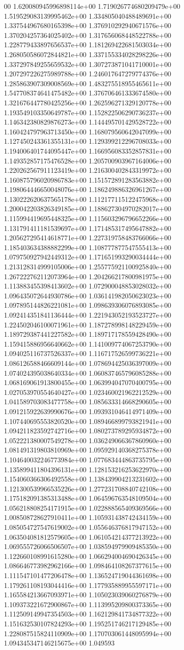00	1.620080945996898114e+00	1.719026774680209479e+00	1.519529083139995462e+00	1.334805040488489691e+00	1.337544967680165398e+00	1.376910292940671576e+00	1.370204257364025402e+00	1.317656068448522788e+00	1.228779433897656537e+00	1.181269422681503034e+00	1.268050586072844821e+00	1.337155334028298226e+00	1.337297849255659532e+00	1.307273871041710001e+00	1.207297226275989788e+00	1.246017647279774376e+00	1.285863907309008569e+00	1.483275518955465611e+00	1.547708374641475482e+00	1.376706461333674580e+00	1.321676447780425256e+00	1.262596271329120778e+00	1.193549103350649787e+00	1.152822506290736237e+00	1.146342380829876273e+00	1.144495701429528722e+00	1.160424797963713450e+00	1.168079560642047099e+00	1.127450243361355131e+00	1.129399212296708033e+00	1.194006401744095447e+00	1.166956083352857831e+00	1.149352857175476528e+00	1.205700903967164006e+00	1.220262567911123419e+00	1.216300402843319972e+00	1.160875796020986783e+00	1.151572891283563882e+00	1.198064446650048076e+00	1.186249886326961267e+00	1.130222620637565178e+00	1.112177115122475968e+00	1.200042203826349185e+00	1.188627304970282017e+00	1.115994419695448325e+00	1.115603296796652266e+00	1.131791411181539697e+00	1.171485317495647882e+00	1.205627295414618771e+00	1.227319758483766066e+00	1.185403634388882299e+00	1.108777877547555413e+00	1.079750927942449312e+00	1.171651993290034444e+00	1.213128314999105006e+00	1.255775921100925840e+00	1.267222762112073964e+00	1.204266217800981975e+00	1.113883455398413602e+00	1.072900048853028032e+00	1.096435072644930786e+00	1.036141982050623023e+00	1.097895144826221081e+00	1.098639306076893085e+00	1.092414351841136444e+00	1.221943052193523727e+00	1.224502046100071961e+00	1.187278998148229459e+00	1.189729387441227582e+00	1.189717178559428490e+00	1.159415886956640662e+00	1.141009774067253790e+00	1.094025116737526337e+00	1.116717526599736221e+00	1.086126588466609144e+00	1.078694425036397009e+00	1.074024395038640334e+00	1.060837465796085288e+00	1.068169061913800455e+00	1.063994047070400795e+00	1.027053970554640427e+00	1.023460021962212529e+00	1.041589703083477758e+00	1.085633314668290605e+00	1.091215922639990676e+00	1.093931046414971409e+00	1.107440695553820520e+00	1.089466899793821941e+00	1.094211823592742716e+00	1.080273789295934872e+00	1.052221380007549278e+00	1.036249066367860960e+00	1.081491319803810969e+00	1.095929140368275378e+00	1.104640032246773984e+00	1.077683444863735795e+00	1.135899411804396131e+00	1.128153216253622970e+00	1.154060366306492558e+00	1.138439904213231602e+00	1.121300539966535226e+00	1.277231708840742108e+00	1.175182091385313488e+00	1.064596763548109504e+00	1.056218808254171915e+00	1.022888565409369566e+00	1.008508728627910411e+00	1.105931438742434159e+00	1.085054727547619002e+00	1.055646376817947152e+00	1.063504081812579605e+00	1.061054214377213922e+00	1.069555726066506507e+00	1.038594979909485350e+00	1.122660108991615280e+00	1.066294004690426345e+00	1.086646773982962166e+00	1.098464108267377615e+00	1.111547101477206478e+00	1.136524719044361698e+00	1.179261108193044416e+00	1.177935889955597171e+00	1.165584213667093971e+00	1.105023039060276879e+00	1.109373221672900867e+00	1.113995209800373365e+00	1.112509149947354503e+00	1.162129841734877322e+00	1.151632530107824293e+00	1.195251746217129485e+00	1.228087515824110909e+00	1.170703061448095994e+00	1.094345347146215675e+00	1.049593